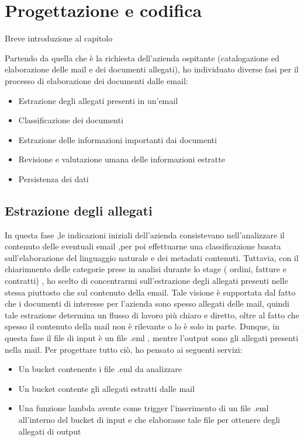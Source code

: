 \chapter{Progettazione e codifica}
\label{cap:progettazione-codifica}

Breve introduzione al capitolo


Partendo da quella che è la richiesta dell'azienda ospitante (catalogazione ed elaborazione delle mail e dei documenti allegati), ho individuato diverse fasi per il processo di elaborazione dei documenti dalle email: 
\begin{itemize}
  \item Estrazione degli allegati presenti in un'email
  \item Classificazione dei documenti
  \item Estrazione delle informazioni importanti dai documenti
  \item  Revisione e valutazione umana delle informazioni estratte
  \item Persistenza dei dati
\end{itemize}

\section{Estrazione degli allegati}
\label{sec:estrazione-allegati}
In questa fase ,le indicazioni iniziali dell'azienda consistevano nell'analizzare il contenuto delle eventuali  email ,per poi effettuarne una classificazione basata sull'elaborazione del linguaggio naturale e dei metadati contenuti. Tuttavia, con il chiarimnento delle categorie prese in analisi durante lo stage ( ordini, fatture e contratti) , ho scelto di concentrarmi sull'estrazione degli allegati presenti nelle stessa piuttosto che sul contenuto della email. 
Tale visione è supportata dal fatto che i documenti di interesse per l'azienda sono spesso allegati delle mail, quindi  tale estrazione determina un flusso di lavoro più chiaro e diretto, oltre al fatto che spesso il contenuto della mail non è rilevante o lo è solo in parte.
Dunque, in questa fase il file di input è un file .eml , mentre l'output sono gli allegati presenti nella mail. Per progettare tutto ciò, ho pensato ai seguenti servizi:
\begin{itemize}
    \item Un bucket contenente i file .eml da analizzare
    \item Un bucket contente gli allegati estratti dalle mail 
    \item Una funzione lambda avente come trigger l'inserimento di un file .eml all'interno del bucket di input e che elaborasse tale file per ottenere degli allegati di output
\end{itemize}

